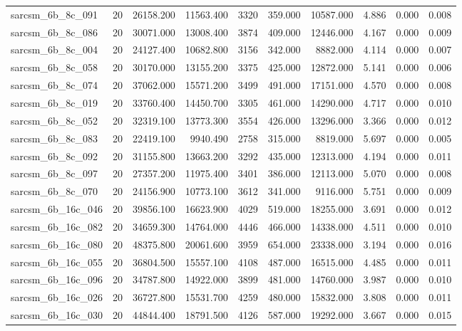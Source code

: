 \begin{tabular}{lrrrrrrrrr}
sarcsm\_6b\_8c\_091 & 20 & 26158.200 & 11563.400 & 3320 & 359.000 & 10587.000 & 4.886 & 0.000 & 0.008 \\
sarcsm\_6b\_8c\_086 & 20 & 30071.000 & 13008.400 & 3874 & 409.000 & 12446.000 & 4.167 & 0.000 & 0.009 \\
sarcsm\_6b\_8c\_004 & 20 & 24127.400 & 10682.800 & 3156 & 342.000 & 8882.000 & 4.114 & 0.000 & 0.007 \\
sarcsm\_6b\_8c\_058 & 20 & 30170.000 & 13155.200 & 3375 & 425.000 & 12872.000 & 5.141 & 0.000 & 0.006 \\
sarcsm\_6b\_8c\_074 & 20 & 37062.000 & 15571.200 & 3499 & 491.000 & 17151.000 & 4.570 & 0.000 & 0.008 \\
sarcsm\_6b\_8c\_019 & 20 & 33760.400 & 14450.700 & 3305 & 461.000 & 14290.000 & 4.717 & 0.000 & 0.010 \\
sarcsm\_6b\_8c\_052 & 20 & 32319.100 & 13773.300 & 3554 & 426.000 & 13296.000 & 3.366 & 0.000 & 0.012 \\
sarcsm\_6b\_8c\_083 & 20 & 22419.100 & 9940.490 & 2758 & 315.000 & 8819.000 & 5.697 & 0.000 & 0.005 \\
sarcsm\_6b\_8c\_092 & 20 & 31155.800 & 13663.200 & 3292 & 435.000 & 12313.000 & 4.194 & 0.000 & 0.011 \\
sarcsm\_6b\_8c\_097 & 20 & 27357.200 & 11975.400 & 3401 & 386.000 & 12113.000 & 5.070 & 0.000 & 0.008 \\
sarcsm\_6b\_8c\_070 & 20 & 24156.900 & 10773.100 & 3612 & 341.000 & 9116.000 & 5.751 & 0.000 & 0.009 \\
sarcsm\_6b\_16c\_046 & 20 & 39856.100 & 16623.900 & 4029 & 519.000 & 18255.000 & 3.691 & 0.000 & 0.012 \\
sarcsm\_6b\_16c\_082 & 20 & 34659.300 & 14764.000 & 4446 & 466.000 & 14338.000 & 4.511 & 0.000 & 0.010 \\
sarcsm\_6b\_16c\_080 & 20 & 48375.800 & 20061.600 & 3959 & 654.000 & 23338.000 & 3.194 & 0.000 & 0.016 \\
sarcsm\_6b\_16c\_055 & 20 & 36804.500 & 15557.100 & 4108 & 487.000 & 16515.000 & 4.485 & 0.000 & 0.011 \\
sarcsm\_6b\_16c\_096 & 20 & 34787.800 & 14922.000 & 3899 & 481.000 & 14760.000 & 3.987 & 0.000 & 0.010 \\
sarcsm\_6b\_16c\_026 & 20 & 36727.800 & 15531.700 & 4259 & 480.000 & 15832.000 & 3.808 & 0.000 & 0.011 \\
sarcsm\_6b\_16c\_030 & 20 & 44844.400 & 18791.500 & 4126 & 587.000 & 19292.000 & 3.667 & 0.000 & 0.015 \\

\end{tabular}
